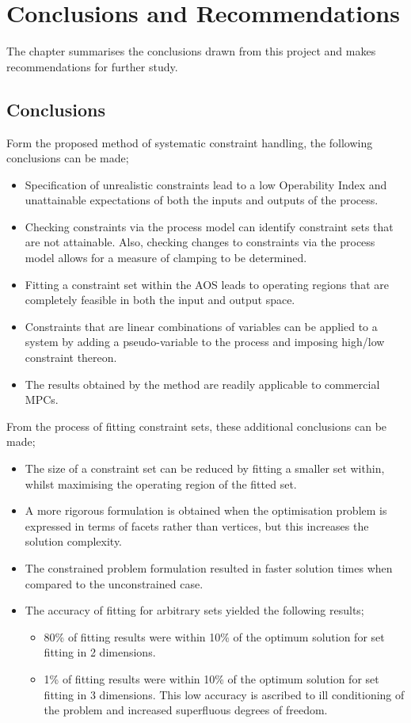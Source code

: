 \chapter{Conclusions and Recommendations}\label{chap:conclusion}
\begin{overview}
  The chapter summarises the conclusions drawn from this project and makes recommendations for further study.
\end{overview}

\section{Conclusions}
Form the proposed method of systematic constraint handling, the following conclusions can be made;
\begin{itemize}
  \item Specification of unrealistic constraints lead to a low Operability Index and unattainable expectations of both the inputs and outputs of the process.
  \item Checking constraints via the process model can identify constraint sets that are not attainable. Also, checking changes to constraints via the process model allows for a measure of clamping to be determined.
  \item Fitting a constraint set within the AOS leads to operating regions that are completely feasible in both the input and output space.
  \item Constraints that are linear combinations of variables can be applied to a system by adding a pseudo-variable to the process and imposing high/low constraint thereon.
  \item The results obtained by the method are readily applicable to commercial MPCs.
\end{itemize}

From the process of fitting constraint sets, these additional conclusions can be made;
\begin{itemize}
\item The size of a constraint set can be reduced by fitting a smaller set within, whilst maximising the operating region of the fitted set.
\item A more rigorous formulation is obtained when the optimisation problem is expressed in terms of facets rather than vertices, but this increases the solution complexity.
\item The constrained problem formulation resulted in faster solution times when compared to the unconstrained case.
\item The accuracy of fitting for arbitrary sets yielded the following results;
  \begin{itemize}
  \item 80\% of fitting results were within 10\% of the optimum solution for set fitting in 2 dimensions.
  \item 1\% of fitting results were within 10\% of the optimum solution for set fitting in 3 dimensions.
  This low accuracy is ascribed to ill conditioning of the problem and increased superfluous degrees of freedom.
  \end{itemize}
\end{itemize}

